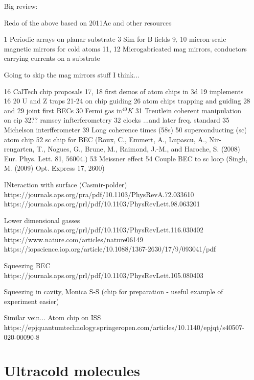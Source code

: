 Big review: \cite{2011Ac}


Redo of the above based on 2011Ac and other resources

1 Periodic arrays on planar substrate
3 Sim for B fields
9, 10 micron-scale magnetic mirrors for cold atoms
11, 12 Microgabricated mag mirrors, conductors carrying currents on a substrate

Going to skip the mag mirrors stuff I think...

16 CalTech chip proposals \cite{PhysRevA.52.4004}
17, 18 first demos of atom chips in 3d \cite{PhysRevLett.80.1634} \cite{PhysRevLett.81.5310}
19 implements 16 \cite{Drindic1998} %
20 U and Z traps \cite{Reichel1999}
21-24 on chip guiding \cite{PhysRevLett.82.2014}
26 atom chips trapping and guiding \cite{Folman2000}
28 and 29 joint first BECs \cite{Hansel2001} \cite{Ott2001}
30 Fermi gas in$^{40}K$ \cite{Aubin2006}
31 Treutlein coherent manipulation on cip \cite{Treutlein2004}
32?? ramsey infterferometery
32 clocks \cite{Knappe2004}
...and later freq. standard \cite{RAMIREZMARTINEZ2011247}
35 Michelson interfferometer \cite{Wang2005}
39 Long coherence times (58s) \cite{Deutsch2010}
50 superconducting (sc) atom chip \cite{Nirrengarten2006}
52 sc chip for BEC
(Roux, C., Emmert, A., Lupascu, A., Nir- rengarten, T., Nogues, G., Brune, M.,
Raimond, J.-M., and Haroche, S. (2008) Eur. Phys. Lett. 81, 56004.)
53 Meissner effect \cite{Cano2008}
54 Couple BEC to sc loop (Singh, M. (2009) Opt. Express 17, 2600)


INteraction with surface (Casmir-polder)
https://journals.aps.org/pra/pdf/10.1103/PhysRevA.72.033610
https://journals.aps.org/prl/pdf/10.1103/PhysRevLett.98.063201


Lower dimensional gasses https://journals.aps.org/prl/pdf/10.1103/PhysRevLett.116.030402
https://www.nature.com/articles/nature06149
https://iopscience.iop.org/article/10.1088/1367-2630/17/9/093041/pdf

Squeezing BEC
https://journals.aps.org/prl/pdf/10.1103/PhysRevLett.105.080403

Squeezing in cavity, Monica S-S (chip for preparation - useful example of experiment
easier) \cite{PhysRevLett.104.073604}

Similar vein...
Atom chip on ISS https://epjquantumtechnology.springeropen.com/articles/10.1140/epjqt/s40507-020-00090-8



\section{Ultracold molecules}


